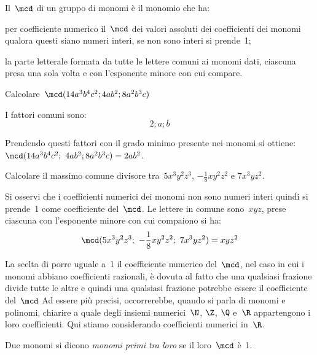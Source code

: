 \begin{procedura}

Il~$\mcd$ di un gruppo di monomi è il monomio che ha:

\begin{enumeratea}
 \item per coefficiente numerico il~$\mcd$ dei valori assoluti dei
coefficienti dei monomi qualora
questi siano numeri interi, se non sono interi si prende~1;
 \item la parte letterale formata da tutte le lettere comuni ai monomi
dati, ciascuna presa una sola volta e con l'esponente minore con cui 
compare.
\end{enumeratea}
\end{procedura}

\begin{exrig}
 \begin{esempio}
Calcolare~$\mcd (14a^{3}b^{4}c^{2};4ab^{2};8a^{2}b^{3}c)$ 

I fattori comuni sono:
\[2; a; b\]

Prendendo questi fattori con il grado minimo presente nei monomi 
si ottiene:~$\mcd(14a^{3}b^{4}c^{2};~4ab^{2};8a^{2}b^{3}c)=2ab^{2}$.
 \end{esempio}

 \begin{esempio}
Calcolare il massimo comune divisore tra~$5x^{3}y^{2}z^{3}$, 
$-\frac{1}{8}xy^{2}z^{2}$ e $7x^{3}yz^{2}$.

Si osservi che i coefficienti numerici dei monomi non sono numeri interi
quindi si prende~1 come coefficiente del~$\mcd$.
Le lettere in comune sono~$xyz$, prese ciascuna con
l'esponente minore con cui compaiono si ha:
\[\mcd(5x^{3}y^{2}z^{3};~-\frac{1}{8}xy^{2}z^{2};~7x^{3}yz^{2})=xyz^{2}\]
 \end{esempio}
\end{exrig}

\osservazione La scelta di porre uguale a~1 il coefficiente numerico 
del~$\mcd$, nel
caso in cui i monomi abbiano coefficienti razionali, è dovuta al
fatto che una qualsiasi frazione divide tutte le altre e quindi una
qualsiasi frazione potrebbe essere il coefficiente del~$\mcd$ Ad essere
più precisi, occorrerebbe, quando si parla di monomi e polinomi,
chiarire a quale degli insiemi numerici~$\N$, $\Z$, $\Q$ e~$\R$ 
appartengono i loro coefficienti. Qui stiamo considerando coefficienti 
numerici in~$\R$.

\begin{definizione}
 Due monomi si dicono \emph{monomi primi tra loro} se il loro~$\mcd$ è~1.
\end{definizione}

